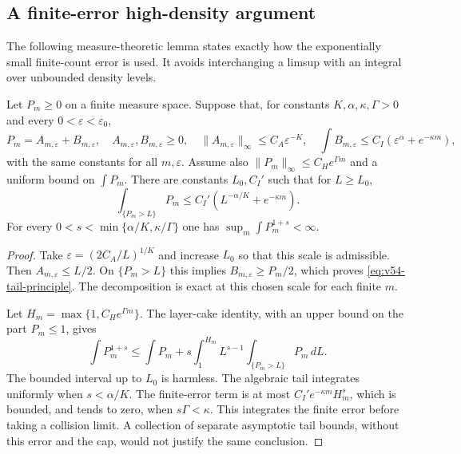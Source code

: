 \subsection{A finite-error high-density argument}
The following measure-theoretic lemma states exactly how the exponentially
small finite-count error is used. It avoids interchanging a limsup with
an integral over unbounded density levels.

\begin{lemma}
\label{lem:v54-tail-principle}
Let $P_m\ge0$ on a finite measure space. Suppose that, for constants
$K,\alpha,\kappa,\Gamma>0$ and every $0<\varepsilon<\varepsilon_0$,
\[
 P_m=A_{m,\varepsilon}+B_{m,\varepsilon},\quad
 A_{m,\varepsilon},B_{m,\varepsilon}\ge0,\quad
 \|A_{m,\varepsilon}\|_\infty\le C_A\varepsilon^{-K},
 \quad \int B_{m,\varepsilon}\le C_I(\varepsilon^\alpha+e^{-\kappa m}),
\]
with the same constants for all $m,\varepsilon$. Assume also
$\|P_m\|_\infty\le C_H e^{\Gamma m}$ and a uniform bound on
$\int P_m$. There are constants $L_0,C_I'$ such that for $L\ge L_0$,
\begin{equation}\label{eq:v54-tail-principle}
 \int_{\{P_m>L\}}P_m
      \le C_I'(L^{-\alpha/K}+e^{-\kappa m}).
\end{equation}
For every $0<s<\min\{\alpha/K,\kappa/\Gamma\}$ one has
$\sup_m\int P_m^{1+s}<\infty$.
\end{lemma}
\begin{proof}
Take $\varepsilon=(2C_A/L)^{1/K}$ and increase $L_0$ so that this
scale is admissible. Then $A_{m,\varepsilon}\le L/2$. On
$\{P_m>L\}$ this implies $B_{m,\varepsilon}\ge P_m/2$, which
proves \eqref{eq:v54-tail-principle}. The decomposition is exact at
this chosen scale for each finite $m$.

Let $H_m=\max\{1,C_H e^{\Gamma m}\}$. The layer-cake identity,
with an upper bound on the part $P_m\le1$, gives
\[
 \int P_m^{1+s}
 \le \int P_m+s\int_1^{H_m}L^{s-1}
                    \int_{\{P_m>L\}}P_m\,dL.
\]
The bounded interval up to $L_0$ is harmless. The algebraic tail
integrates uniformly when $s<\alpha/K$. The finite-error term is
at most $C_I'e^{-\kappa m}H_m^s$, which is bounded, and tends to
zero, when $s\Gamma<\kappa$. This integrates the finite error
before taking a collision limit. A collection of separate asymptotic
tail bounds, without this error and the cap, would not justify the
same conclusion.
\end{proof}

